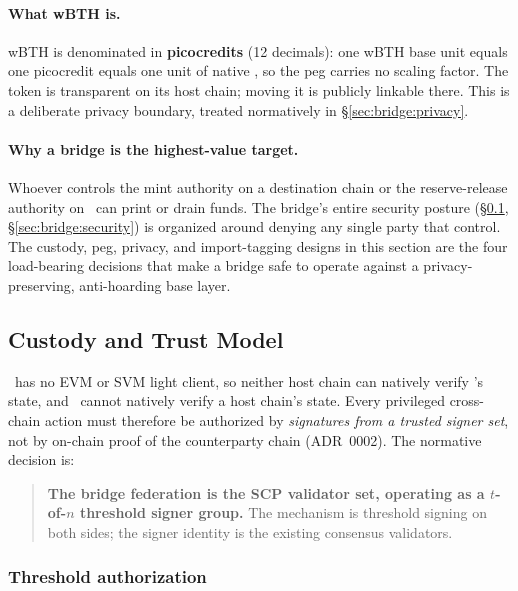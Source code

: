\paragraph{What wBTH is.} wBTH is denominated in \textbf{picocredits} (12
decimals): one wBTH base unit equals one picocredit equals one unit of native
\BTH, so the peg carries no scaling factor.
The token is transparent on its host chain; moving it is publicly linkable
there. This is a deliberate privacy boundary, treated normatively in
\S\ref{sec:bridge:privacy}.

\paragraph{Why a bridge is the highest-value target.} Whoever controls the
mint authority on a destination chain or the reserve-release authority on
\Botho\ can print or drain funds. The bridge's entire security posture
(\S\ref{sec:bridge:custody}, \S\ref{sec:bridge:security}) is organized around
denying any single party that control. The custody, peg, privacy, and
import-tagging designs in this section are the four load-bearing decisions that
make a bridge safe to operate against a privacy-preserving, anti-hoarding base
layer.

\subsection{Custody and Trust Model}
\label{sec:bridge:custody}

\Botho\ has no EVM or SVM light client, so neither host chain can natively
verify \Botho's state, and \Botho\ cannot natively verify a host chain's
state. Every privileged cross-chain action must therefore be authorized by
\emph{signatures from a trusted signer set}, not by on-chain proof of the
counterparty chain (ADR~0002). The normative decision is:

\begin{quote}
\textbf{The bridge federation is the SCP validator set, operating as a
$t$-of-$n$ threshold signer group.} The mechanism is threshold signing on both
sides; the signer identity is the existing consensus validators.
\end{quote}

\subsubsection{Threshold authorization}

